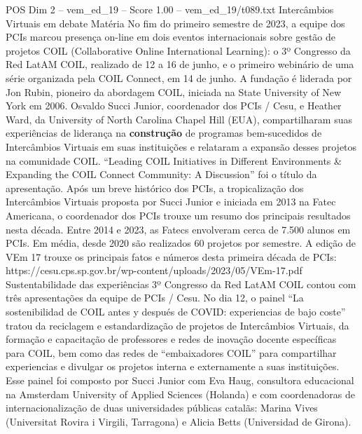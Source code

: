 \begin{textsample}{POS Dim 2 – vem\_ed\_19 – Score 1.00 – vem\_ed\_19/t089.txt}  \label{ex:f2_pos_022}
Intercâmbios Virtuais em debate Matéria No fim do primeiro semestre de 2023, a equipe dos PCIs marcou presença on-line em dois eventos internacionais sobre gestão de projetos COIL (Collaborative Online International Learning): o 3º Congresso da Red LatAM COIL, realizado de 12 a 16 de junho, e o primeiro webinário de uma série organizada pela COIL Connect, em 14 de junho.
A fundação é liderada por Jon Rubin, pioneiro da abordagem COIL, iniciada na State University of New York em 2006.
Osvaldo Succi Junior, coordenador dos PCIs / Cesu, e Heather Ward, da University of North Carolina Chapel Hill (EUA), compartilharam suas experiências de liderança na \textbf{construção} de programas bem-sucedidos de Intercâmbios Virtuais em suas instituições e relataram a expansão desses projetos na comunidade COIL. “Leading COIL Initiatives in Different Environments \& Expanding the COIL Connect Community: A Discussion” foi o título da apresentação.
Após um breve histórico dos PCIs, a tropicalização dos Intercâmbios Virtuais proposta por Succi Junior e iniciada em 2013 na Fatec Americana, o coordenador dos PCIs trouxe um resumo dos principais resultados nesta década.
Entre 2014 e 2023, as Fatecs envolveram cerca de 7.500 alunos em PCIs.
Em média, desde 2020 são realizados 60 projetos por semestre.
A edição de VEm 17 trouxe os principais fatos e números desta primeira década de PCIs: https://cesu.cps.sp.gov.br/wp-content/uploads/2023/05/VEm-17.pdf Sustentabilidade das experiências 3º Congresso da Red LatAM COIL contou com três apresentações da equipe de PCIs / Cesu.
No dia 12, o painel “La sostenibilidad de COIL antes y después de COVID: experiencias de bajo coste” tratou da reciclagem e estandardização de projetos de Intercâmbios Virtuais, da formação e capacitação de professores e redes de inovação docente específicas para COIL, bem como das redes de “embaixadores COIL” para compartilhar experiencias e divulgar os projetos interna e externamente a suas instituições.
Esse painel foi composto por Succi Junior com Eva Haug, consultora educacional na Amsterdam University of Applied Sciences (Holanda) e com coordenadoras de internacionalização de duas universidades públicas catalãs: Marina Vives (Universitat Rovira i Virgili, Tarragona) e Alicia Betts (Universidad de Girona).

\end{textsample}
